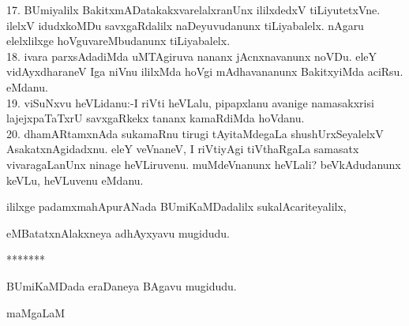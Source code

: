 \documentclass{article}
\begin{document}
17. BUmiyalilx BakitxmADatakakxvarelalxranUnx ililxdedxV tiLiyutetxVne. ilelxV idudxkoMDu savxgaRdalilx naDeyuvudanunx tiLiyabalelx. nAgaru elelxlilxge hoVguvareMbudanunx tiLiyabalelx.\\
18. ivara parxsAdadiMda uMTAgiruva nananx jAcnxnavanunx noVDu. eleY vidAyxdharaneV Iga niVnu ililxMda hoVgi mAdhavananunx BakitxyiMda aciRsu. eMdanu.\\
19. viSuNxvu heVLidanu:-I riVti heVLalu, pipapxlanu avanige namasakxrisi lajejxpaTaTxrU savxgaRkekx tananx kamaRdiMda hoVdanu.\\
20. dhamARtamxnAda sukamaRnu tirugi tAyitaMdegaLa shushUrxSeyalelxV AsakatxnAgidadxnu. eleY veVnaneV, I riVtiyAgi tiVthaRgaLa samasatx vivaragaLanUnx ninage heVLiruvenu. muMdeVnanunx heVLali? beVkAdudanunx keVLu, heVLuvenu eMdanu.\\

\begin{center}
ililxge padamxmahApurANada BUmiKaMDadalilx sukalAcariteyalilx,
\end{center}

\begin{center}
eMBatatxnAlakxneya adhAyxyavu mugidudu.
\end{center}

\begin{center}
*******
\end{center}

\begin{center}
BUmiKaMDada eraDaneya BAgavu mugidudu.
\end{center}

\begin{center}
maMgaLaM
\end{center}
 
\end{document}
